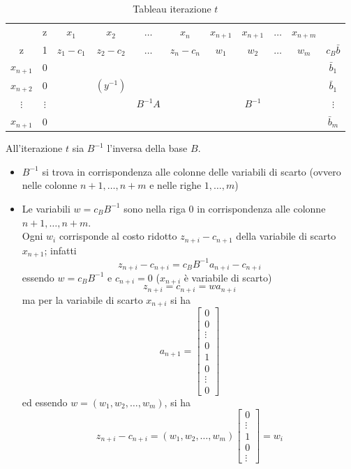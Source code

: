 \begin{table}[h]
	\centering
	\caption{Tableau iterazione $t$}
	\begin{tabular}{c|c|cccc|cccc|c|}
		& z & $x_{1}$ & $x_{2}$ & $\dots$ & $x_{n}$ & $x_{n+1}$ & $x_{n+1}$ & $\dots$ & $x_{n+m}$ & \\ \cline{2-11}
		z & 1 & $z_{1}-c_{1}$ & $z_{2}-c_{2}$ & $\dots$ & $z_{n}-c_{n}$ & $w_{1}$ & $w_{2}$ & $\dots$ & $w_{m}$ & $c_{B}\bar{b}$ \\ \cline{2-11}
		$x_{n+1}$ & 0 &  &  &  &  &  &  &  & & $\bar{b}_{1}$ \\
		$x_{n+2}$ & 0 & & $(y^{-1})$ &  &  &  &  &  & & $\bar{b}_{1}$ \\
		$\vdots$ & $\vdots$ &  &  & $B^{-1}A$ &  &  & $B^{-1}$ & & & $\vdots$ \\
		$x_{n+1}$ & 0 &  &  &  &  &  &  &  & & $\bar{b}_{m}$ \\ \cline{2-11}
	\end{tabular}
\end{table}
All'iterazione $t$ sia $B^{-1}$ l'inversa della base $B$.
\begin{itemize}
	\item $B^{-1}$ si trova in corrispondenza alle colonne delle variabili di scarto (ovvero nelle colonne $n+1,\dots,n+m$ e nelle righe $1,\dots,m$)
	\item Le variabili $w=c_{B}B^{-1}$ sono nella riga 0 in corrispondenza alle colonne $n+1,\dots,n+m$.\\
	Ogni $w_{i}$ corrisponde al costo ridotto $z_{n+i}-c_{n+1}$ della variabile di scarto $x_{n+1}$; infatti
	\begin{equation*}
		z_{n+i}-c_{n+i}=c_{B}B^{-1}a_{n+i}-c_{n+i}
	\end{equation*}
	essendo $w=c_{B}B^{-1}$ e $c_{n+i}=0$ ($x_{n+i}$ è variabile di scarto)
	\begin{equation*}
		z_{n+i}=c_{n+i}=w a_{n+i}
	\end{equation*}
	ma per la variabile di scarto $x_{n+i}$ si ha
	\begin{equation*}
		a_{n+1}=\begin{bmatrix}
		0 \\ 0 \\ \vdots \\ 0 \\ 1 \\ 0 \\ \vdots \\ 0
		\end{bmatrix}
	\end{equation*}
	ed essendo $w=(w_{1},w_{2},\dots,w_{m})$, si ha
	\begin{equation*}
		z_{n+i}-c_{n+i}=(w_{1},w_{2},\dots,w_{m})\begin{bmatrix}
		0 \\ \vdots \\ 1 \\ 0 \\ \vdots
		\end{bmatrix}=w_{i}
	\end{equation*}
\end{itemize}

